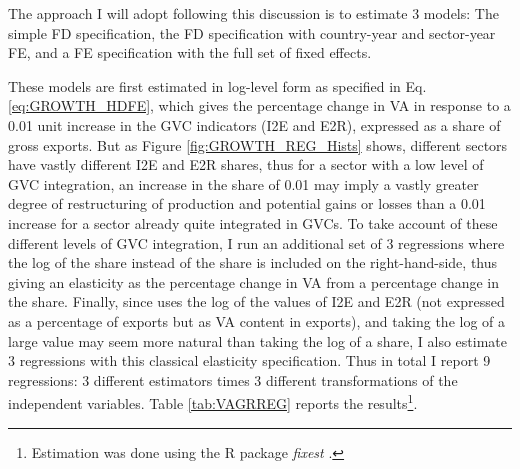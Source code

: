 \documentclass[a4paper]{article}
\begin{document}
The approach I will adopt following this discussion is to estimate 3 models: The simple FD specification, the FD specification with country-year and sector-year FE, and a FE specification with the full set of fixed effects. \newline 

These models are first estimated in log-level form as specified in Eq. \ref{eq:GROWTH_HDFE}, which gives the percentage change in VA in response to a 0.01 unit increase in the GVC indicators (I2E and E2R), expressed as a share of gross exports. But as Figure \ref{fig:GROWTH_REG_Hists} shows, different sectors have vastly different I2E and E2R shares, thus for a sector with a low level of GVC integration, an increase in the share of 0.01 may imply a vastly greater degree of restructuring of production and potential gains or losses than a 0.01 increase for a sector already quite integrated in GVCs. To take account of these different levels of GVC integration, I run an additional set of 3 regressions where the log of the share instead of the share is included on the right-hand-side, thus giving an elasticity as the percentage change in VA from a percentage change in the share. Finally, since \citet{Kummritz20161} uses the log of the values of I2E and E2R (not expressed as a percentage of exports but as VA content in exports), and taking the log of a large value may seem more natural than taking the log of a share, I also estimate 3 regressions with this classical elasticity specification. Thus in total I report 9 regressions:  3 different estimators times 3 different transformations of the independent variables. Table \ref{tab:VAGRREG} reports the results\footnote{Estimation was done using the R package \textit{fixest} \citep{fixest2018}.}. \newline %
\end{document}
